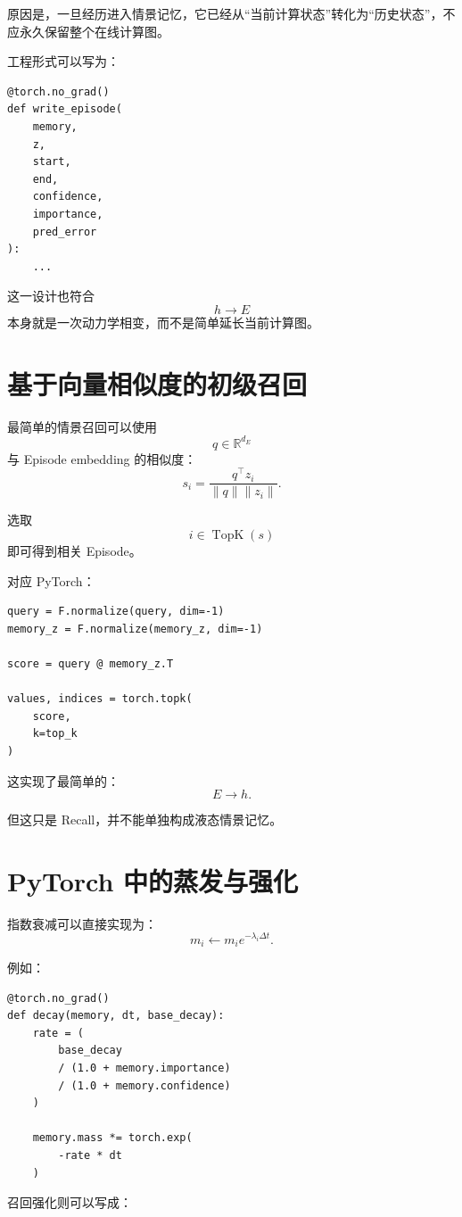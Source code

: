 原因是，一旦经历进入情景记忆，它已经从“当前计算状态”转化为“历史状态”，不应永久保留整个在线计算图。

工程形式可以写为：

\begin{verbatim}
@torch.no_grad()
def write_episode(
    memory,
    z,
    start,
    end,
    confidence,
    importance,
    pred_error
):
    ...
\end{verbatim}

这一设计也符合
\[
\boxed{
h\rightarrow E
}
\]
本身就是一次动力学相变，而不是简单延长当前计算图。

\section{基于向量相似度的初级召回}

最简单的情景召回可以使用
\[
q
\in
\mathbb R^{d_E}
\]
与 Episode embedding 的相似度：
\[
s_i
=
\frac{
q^\top z_i
}{
\|q\|\|z_i\|
}.
\]

选取
\[
i\in
\operatorname{TopK}(s)
\]
即可得到相关 Episode。

对应 PyTorch：

\begin{verbatim}
query = F.normalize(query, dim=-1)
memory_z = F.normalize(memory_z, dim=-1)

score = query @ memory_z.T

values, indices = torch.topk(
    score,
    k=top_k
)
\end{verbatim}

这实现了最简单的：
\[
\boxed{
E\rightarrow h.
}
\]

但这只是 Recall，并不能单独构成液态情景记忆。

\section{PyTorch 中的蒸发与强化}

指数衰减可以直接实现为：
\[
m_i
\leftarrow
m_i
e^{-\lambda_i\Delta t}.
\]

例如：

\begin{verbatim}
@torch.no_grad()
def decay(memory, dt, base_decay):
    rate = (
        base_decay
        / (1.0 + memory.importance)
        / (1.0 + memory.confidence)
    )

    memory.mass *= torch.exp(
        -rate * dt
    )
\end{verbatim}

召回强化则可以写成：

